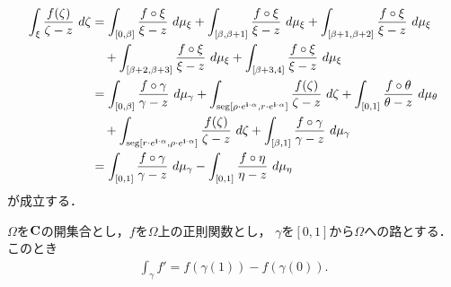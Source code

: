 	\begin{align}
		\int_{\xi} \frac{f(\zeta)}{\zeta - z}\ d\zeta
		&= \int_{[0,\beta]} \frac{f \circ \xi}{\xi - z}\ d\mu_{\xi} 
			+ \int_{[\beta,\beta+1]} \frac{f \circ \xi}{\xi - z}\ d\mu_{\xi}
			+ \int_{[\beta+1,\beta+2]} \frac{f \circ \xi}{\xi - z}\ d\mu_{\xi} \\
			&\quad + \int_{[\beta+2,\beta+3]} \frac{f \circ \xi}{\xi - z}\ d\mu_{\xi}
			+ \int_{[\beta+3,4]} \frac{f \circ \xi}{\xi - z}\ d\mu_{\xi} \\
		&= \int_{[0,\beta]} \frac{f \circ \gamma}{\gamma - z}\ d\mu_{\gamma} 
			+ \int_{\seg{\rho \cdot e^{\isym \cdot \alpha}}{r \cdot e^{\isym \cdot \alpha}}} \frac{f(\zeta)}{\zeta - z}\ d\zeta
			+ \int_{[0,1]} \frac{f \circ \theta}{\theta - z}\ d\mu_{\theta} \\
			&\quad + \int_{\seg{r \cdot e^{\isym \cdot \alpha}}{\rho \cdot e^{\isym \cdot \alpha}}} \frac{f(\zeta)}{\zeta - z}\ d\zeta
			+ \int_{[\beta,1]} \frac{f \circ \gamma}{\gamma - z}\ d\mu_{\gamma} \\
		&= \int_{[0,1]} \frac{f \circ \gamma}{\gamma - z}\ d\mu_{\gamma} - \int_{[0,1]} \frac{f \circ \eta}{\eta - z}\ d\mu_{\eta}
	\end{align}
	が成立する．
	
	\begin{screen}
		\begin{thm}[線積分の微分積分学の基本定理]
			$\Omega$を$\mathbf{C}$の開集合とし，$f$を$\Omega$上の正則関数とし，
			$\gamma$を$[0,1]$から$\Omega$への路とする．このとき
			\begin{align}
				\int_{\gamma} f' = f(\gamma(1)) - f(\gamma(0)).
			\end{align}
		\end{thm}
	\end{screen}
	
